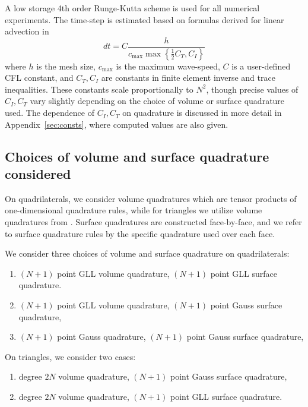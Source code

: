 \documentclass{svjour3}                     %
\newcommand{\LRc}[1]{\left\{ #1 \right\}}
\begin{document}
A low storage 4th order Runge-Kutta scheme \cite{carpenter1994fourth} is used for all numerical experiments.  The time-step is estimated based on formulas derived for linear advection in \cite{chan2015gpu, chan2018multi}
\[
dt = C \frac{h}{c_{\max} \max\LRc{\frac{1}{2}C_T, C_I}}
\]
where $h$ is the mesh size, $c_{\max}$ is the maximum wave-speed, $C$ is a user-defined CFL constant, and $C_T, C_I$ are constants in finite element inverse and trace inequalities.  These constants scale proportionally to $N^2$, though precise values of $C_I, C_T$ vary slightly depending on the choice of volume or surface quadrature used.  The dependence of $C_I, C_T$ on quadrature is discussed in more detail in Appendix~\ref{sec:consts}, where computed values are also given.

\subsection{Choices of volume and surface quadrature considered}
\label{sec:opts}

On quadrilaterals, we consider volume quadratures which are tensor products of one-dimensional quadrature rules, while for triangles we utilize volume quadratures from \cite{xiao2010quadrature}.  Surface quadratures are constructed face-by-face, and we refer to surface quadrature rules by the specific quadrature used over each face.  

We consider three choices of volume and surface quadrature on quadrilaterals: 
\begin{enumerate}
\item $(N+1)$ point GLL volume quadrature, $(N+1)$ point GLL surface quadrature.
\item $(N+1)$ point GLL volume quadrature, $(N+1)$ point Gauss surface quadrature,
\item $(N+1)$ point Gauss quadrature, $(N+1)$ point Gauss surface quadrature,
\end{enumerate}
On triangles, we consider two cases:
\begin{enumerate}
\item degree $2N$ volume quadrature, $(N+1)$ point Gauss surface quadrature,
\item degree $2N$ volume quadrature, $(N+1)$ point GLL surface quadrature.
\end{enumerate}
\end{document}

